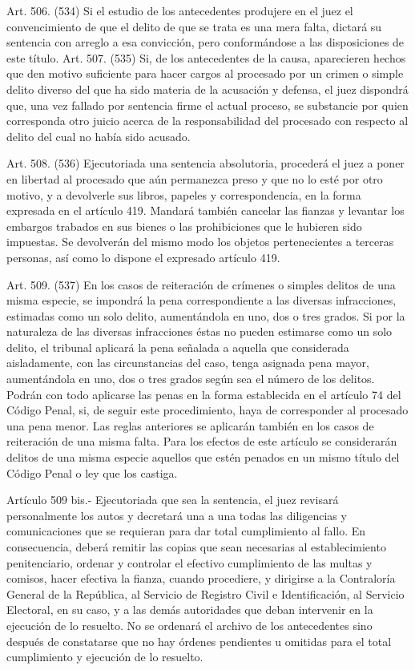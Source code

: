     Art. 506. (534) Si el estudio de los antecedentes produjere en el juez el convencimiento de que el delito de que se trata es una mera falta, dictará su sentencia con arreglo a esa convicción, pero conformándose a las disposiciones de este título.
    Art. 507. (535) Si, de los antecedentes de la causa, aparecieren hechos que den motivo suficiente para hacer cargos al procesado por un crimen o simple delito diverso del que ha sido materia de la acusación y defensa, el juez dispondrá que, una vez fallado por sentencia firme el actual proceso, se substancie por quien corresponda otro juicio acerca de la responsabilidad del procesado con respecto al delito del cual no había sido acusado.


    Art. 508. (536) Ejecutoriada una sentencia absolutoria, procederá el juez a poner en libertad al procesado que aún permanezca preso y que no lo esté por otro motivo, y a devolverle sus libros, papeles y correspondencia, en la forma expresada en el artículo 419. Mandará también cancelar las fianzas y levantar los embargos trabados en sus bienes o las prohibiciones que le hubieren sido impuestas.
    Se devolverán del mismo modo los objetos pertenecientes a terceras personas, así como lo dispone el expresado artículo 419.

    Art. 509. (537) En los casos de reiteración de crímenes o simples delitos de una misma especie, se impondrá la pena correspondiente a las diversas infracciones, estimadas como un solo delito, aumentándola en uno, dos o tres grados.
    Si por la naturaleza de las diversas infracciones éstas no pueden estimarse como un solo delito, el tribunal aplicará la pena señalada a aquella que considerada aisladamente, con las circunstancias del caso, tenga asignada pena mayor, aumentándola en uno, dos o tres grados según sea el número de los delitos.
    Podrán con todo aplicarse las penas en la forma establecida en el artículo 74 del Código Penal, si, de  seguir este procedimiento, haya de corresponder al procesado una pena menor.
    Las reglas anteriores se aplicarán también en los casos de reiteración de una misma falta.
    Para los efectos de este artículo se considerarán delitos de una misma especie aquellos que estén penados en un mismo título del Código Penal o ley que los castiga.


    Artículo 509 bis.- Ejecutoriada que sea la sentencia, el juez revisará personalmente los autos y decretará una a una todas las diligencias y comunicaciones que se requieran para dar total cumplimiento al fallo.
    En consecuencia, deberá remitir las copias que sean necesarias al establecimiento penitenciario, ordenar y controlar el efectivo cumplimiento de las multas y comisos, hacer efectiva la fianza, cuando procediere, y dirigirse a la Contraloría General de la República, al Servicio de Registro Civil e Identificación, al Servicio Electoral, en su caso, y a las demás autoridades que deban intervenir en la ejecución de lo resuelto.
    No se ordenará el archivo de los antecedentes sino después de constatarse que no hay órdenes pendientes u omitidas para el total cumplimiento y ejecución de lo resuelto.

